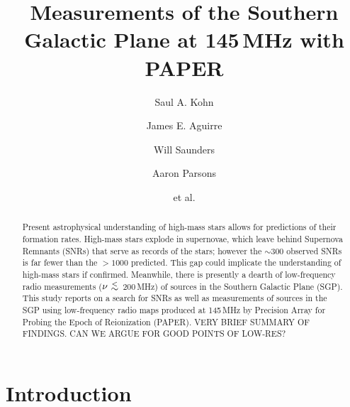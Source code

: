 \documentclass[preprint2,epsf,epsfig,graphics]{emulateapj}
\newcommand {\aplt} {\ {\raise-.5ex\hbox{$\buildrel<\over\sim$}}\ }
\begin{document}
\title{Measurements of the Southern Galactic Plane at 145\,MHz with PAPER}

\author{Saul A. Kohn}
\author{James E. Aguirre}
\author{Will Saunders}
\author{Aaron Parsons}
\author{et al.}



\begin{abstract}
Present astrophysical understanding of high-mass stars allows for predictions of their formation rates.  High-mass stars explode in supernovae, which leave behind Supernova Remnants (SNRs) that serve as records of the stars; however the $\sim$300 observed SNRs is far fewer than the $>1000$ predicted.  This gap could implicate the understanding of high-mass stars if confirmed. 
Meanwhile, there is presently a dearth of low-frequency radio measurements ($\nu\aplt$200\,MHz) of sources in the Southern Galactic Plane (SGP).
This study reports on a search for SNRs as well as measurements of sources in the SGP using low-frequency radio maps produced at 145\,MHz by Precision Array for Probing the Epoch of Reionization (PAPER).
{\color{red} VERY BRIEF SUMMARY OF FINDINGS.}
{\color{blue} CAN WE ARGUE FOR GOOD POINTS OF LOW-RES?}
\end{abstract}

\section{Introduction}
\end{document}
